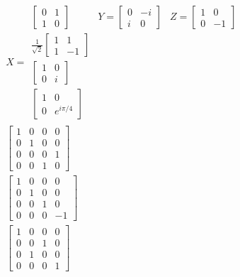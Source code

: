 \documentclass[aspectratio=1610,18pt]{ctexbeamer}
\begin{document}
\begin{frame}
  \begin{align}
    X=\begin{array}{c}
    {\left[\begin{array}{rr}
    0 & 1 \\
    1 & 0
    \end{array}\right]}&Y=
    {\left[\begin{array}{rr}
    0 & -i \\
    i & 0
    \end{array}\right]}&Z=
    {\left[\begin{array}{rr}
    1 & 0 \\
    0 & -1
    \end{array}\right]} \\
    \frac{1}{\sqrt{2}}\left[\begin{array}{rr}
    1 & 1 \\
    1 & -1
    \end{array}\right] \\
    {\left[\begin{array}{rr}
    1 & 0 \\
    0 & i
    \end{array}\right]} \\
    {\left[\begin{array}{lr}
    1 & 0 \\
    0 & e^{i \pi / 4}
    \end{array}\right]}
    \end{array}\\
    \left[\begin{array}{llll}
    1 & 0 & 0 & 0 \\
    0 & 1 & 0 & 0 \\
    0 & 0 & 0 & 1 \\
    0 & 0 & 1 & 0
    \end{array}\right]\\
    \left[\begin{array}{rrrr}
    1 & 0 & 0 & 0 \\
    0 & 1 & 0 & 0 \\
    0 & 0 & 1 & 0 \\
    0 & 0 & 0 & -1
    \end{array}\right]\\
    \left[\begin{array}{llll}
    1 & 0 & 0 & 0 \\
    0 & 0 & 1 & 0 \\
    0 & 1 & 0 & 0 \\
    0 & 0 & 0 & 1
    \end{array}\right]
    \end{align}
\end{frame}
\end{document}
